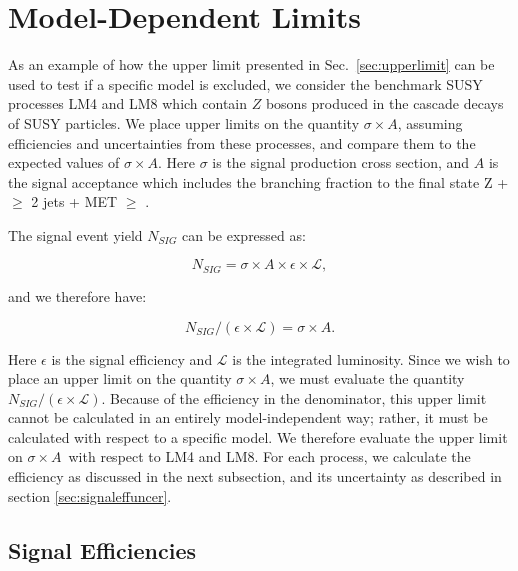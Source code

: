 \newcommand{\sta}{$\sigma\times A$} %

\section{Model-Dependent Limits}
\label{sec:models}

As an example of how the upper limit presented in Sec.~\ref{sec:upperlimit} can be
used to test if a specific model is excluded, we consider the benchmark
SUSY processes LM4 and LM8 which contain
$Z$ bosons produced in the cascade decays of SUSY particles. 
We place upper limits on the quantity \sta,
assuming efficiencies and uncertainties from these processes, and compare them to 
the expected values of \sta.
Here $\sigma$ is the signal production cross section, %
and $A$ is the signal acceptance which includes the branching fraction to the final state Z + $\ge$ 2 jets + MET $\ge$ \signalmett.

The signal event yield $N_{SIG}$ can be expressed as:

\begin{equation}
N_{SIG} = \sigma \times A \times \epsilon \times \mathcal{L},
\end{equation}

and we therefore have:

\begin{equation}
N_{SIG}/( \epsilon \times \mathcal{L}) = \sigma \times A.
\end{equation}

Here  $\epsilon$ is the signal efficiency and $\mathcal{L}$ is the integrated luminosity. 
Since we wish to place an upper limit on the quantity %
\sta, we must evaluate
the quantity $N_{SIG}/(\epsilon \times \mathcal{L})$.  Because of the efficiency
in the denominator, this upper limit cannot be calculated in an entirely model-independent
way; rather, it must be calculated with respect to a specific model. We therefore evaluate
the upper limit on %
\sta\
with respect to LM4 and LM8.  
For each process, we calculate the efficiency as discussed
in the next subsection, and
its uncertainty as described in section \ref{sec:signaleffuncer}.


\subsection{Signal Efficiencies}
\label{sec:sigeff}

